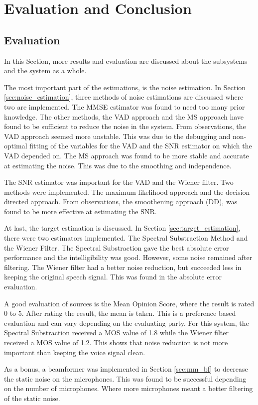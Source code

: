 \section{Evaluation and Conclusion} \label{sec:conclusion}
\subsection{Evaluation}
In this Section, more results and evaluation are discussed about the subsystems and the system as a whole.

The most important part of the estimations, is the noise estimation. In Section \ref{sec:noise_estimation}, three methods of noise estimations are discussed where two are implemented. The MMSE estimator was found to need too many prior knowledge. The other methods, the VAD approach and the MS approach have found to be sufficient to reduce the noise in the system. From observations, the VAD approach seemed more unstable. This was due to the debugging and non-optimal fitting of the variables for the VAD and the SNR estimator on which the VAD depended on. The MS approach was found to be more stable and accurate at estimating the noise. This was due to the smoothing and independence.

The SNR estimator was important for the VAD and the Wiener filter. Two methods were implemented. The maximum likelihood approach and the decision directed approach. From observations, the smoothening approach (DD), was found to be more effective at estimating the SNR.

At last, the target estimation is discussed. In Section \ref{sec:target_estimation}, there were two estimators implemented. The Spectral Substraction Method and the Wiener Filter. The Spectral Substraction gave the best absolute error performance and the intelligibility was good. However, some noise remained after filtering. The Wiener filter had a better noise reduction, but succeeded less in keeping the original speech signal. This was found in the absolute error evaluation.

A good evaluation of sources is the Mean Opinion Score, where the result is rated 0 to 5. After rating the result, the mean is taken. This is a preference based evaluation and can vary depending on the evaluating party. For this system, the Spectral Substraction received a MOS value of 1.8 while the Wiener filter received a MOS value of 1.2. This shows that noise reduction is not more important than keeping the voice signal clean.

As a bonus, a beamformer was implemented in Section \ref{sec:mm_bf} to decrease the static noise on the microphones. This was found to be successful depending on the number of microphones. Where more microphones meant a better filtering of the static noise.

